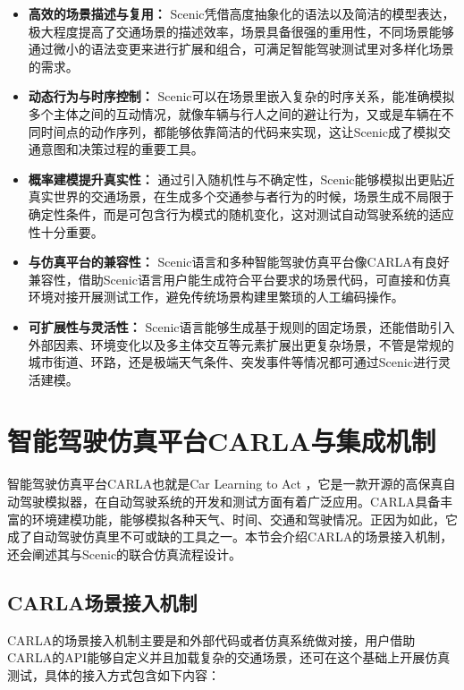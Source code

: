 \begin{itemize}
	\item \textbf{高效的场景描述与复用：} Scenic凭借高度抽象化的语法以及简洁的模型表达，极大程度提高了交通场景的描述效率，场景具备很强的重用性，不同场景能够通过微小的语法变更来进行扩展和组合，可满足智能驾驶测试里对多样化场景的需求。
	
	\item \textbf{动态行为与时序控制：} Scenic可以在场景里嵌入复杂的时序关系，能准确模拟多个主体之间的互动情况，就像车辆与行人之间的避让行为，又或是车辆在不同时间点的动作序列，都能够依靠简洁的代码来实现，这让Scenic成了模拟交通意图和决策过程的重要工具。
	
	\item \textbf{概率建模提升真实性：} 通过引入随机性与不确定性，Scenic能够模拟出更贴近真实世界的交通场景，在生成多个交通参与者行为的时候，场景生成不局限于确定性条件，而是可包含行为模式的随机变化，这对测试自动驾驶系统的适应性十分重要。
	
	\item \textbf{与仿真平台的兼容性：} Scenic语言和多种智能驾驶仿真平台像CARLA有良好兼容性，借助Scenic语言用户能生成符合平台要求的场景代码，可直接和仿真环境对接开展测试工作，避免传统场景构建里繁琐的人工编码操作。
	
	\item \textbf{可扩展性与灵活性：} Scenic语言能够生成基于规则的固定场景，还能借助引入外部因素、环境变化以及多主体交互等元素扩展出更复杂场景，不管是常规的城市街道、环路，还是极端天气条件、突发事件等情况都可通过Scenic进行灵活建模。
\end{itemize}
\section{智能驾驶仿真平台CARLA与集成机制}

智能驾驶仿真平台CARLA也就是Car Learning to Act ，它是一款开源的高保真自动驾驶模拟器，在自动驾驶系统的开发和测试方面有着广泛应用。CARLA具备丰富的环境建模功能，能够模拟各种天气、时间、交通和驾驶情况。正因为如此，它成了自动驾驶仿真里不可或缺的工具之一。本节会介绍CARLA的场景接入机制，还会阐述其与Scenic的联合仿真流程设计。
\subsection{CARLA场景接入机制}

CARLA的场景接入机制主要是和外部代码或者仿真系统做对接，用户借助CARLA的API能够自定义并且加载复杂的交通场景，还可在这个基础上开展仿真测试，具体的接入方式包含如下内容：

